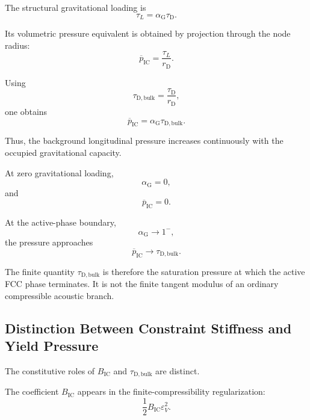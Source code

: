 The structural gravitational loading is
\begin{equation}
    \tau_L = \alpha_{\mathrm{G}}\tau_{\mathrm{D}}.
\end{equation}

Its volumetric pressure equivalent is obtained by projection through the node radius:
\begin{equation}
    \overline{p}_{\mathrm{IC}} = \frac{\tau_L}{r_{\mathrm{D}}}.
\end{equation}

Using
\begin{equation}
    \tau_{\mathrm{D,bulk}} = \frac{\tau_{\mathrm{D}}}{r_{\mathrm{D}}},
\end{equation}
one obtains
\begin{equation}
    \boxed{ \overline{p}_{\mathrm{IC}} = \alpha_{\mathrm{G}} \tau_{\mathrm{D,bulk}} }.
\end{equation}

Thus, the background longitudinal pressure increases continuously with the occupied gravitational capacity.

At zero gravitational loading,
\begin{equation}
    \alpha_{\mathrm{G}} = 0,
\end{equation}
and
\begin{equation}
    \overline{p}_{\mathrm{IC}} = 0.
\end{equation}

At the active-phase boundary,
\begin{equation}
    \alpha_{\mathrm{G}} \rightarrow 1^{-},
\end{equation}
the pressure approaches
\begin{equation}
    \boxed{ \overline{p}_{\mathrm{IC}} \rightarrow \tau_{\mathrm{D,bulk}} }.
\end{equation}

The finite quantity $\tau_{\mathrm{D,bulk}}$ is therefore the saturation pressure at which the active FCC phase terminates. It is not the finite tangent modulus of an ordinary compressible acoustic branch.

\subsection{Distinction Between Constraint Stiffness and Yield Pressure}

The constitutive roles of $B_{\mathrm{IC}}$ and $\tau_{\mathrm{D,bulk}}$ are distinct.

The coefficient $B_{\mathrm{IC}}$ appears in the finite-compressibility regularization:
\begin{equation}
    \frac{1}{2} B_{\mathrm{IC}} \varepsilon_V^2.
\end{equation}

